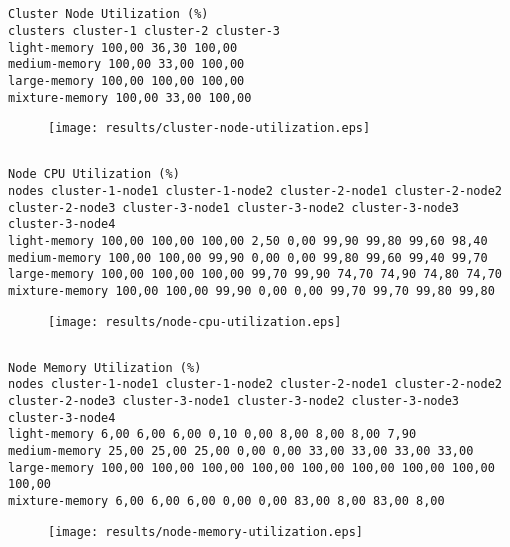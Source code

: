\documentclass{elsart}
\begin{document}
\subsection{}

\begin{lstlisting}[caption={}]
Cluster Node Utilization (%)
clusters cluster-1 cluster-2 cluster-3
light-memory 100,00 36,30 100,00
medium-memory 100,00 33,00 100,00
large-memory 100,00 100,00 100,00
mixture-memory 100,00 33,00 100,00
\end{lstlisting}

\begin{figure}[ht]
\centering
\texttt{[image: results/cluster-node-utilization.eps]}
\caption{}\label{fig:cluster-node-utilization.eps}
\end{figure}

\subsection{}

\begin{lstlisting}[caption={}]
Node CPU Utilization (%)
nodes cluster-1-node1 cluster-1-node2 cluster-2-node1 cluster-2-node2 cluster-2-node3 cluster-3-node1 cluster-3-node2 cluster-3-node3 cluster-3-node4
light-memory 100,00 100,00 100,00 2,50 0,00 99,90 99,80 99,60 98,40
medium-memory 100,00 100,00 99,90 0,00 0,00 99,80 99,60 99,40 99,70
large-memory 100,00 100,00 100,00 99,70 99,90 74,70 74,90 74,80 74,70
mixture-memory 100,00 100,00 99,90 0,00 0,00 99,70 99,70 99,80 99,80
\end{lstlisting}

\begin{figure}[ht]
\centering
\texttt{[image: results/node-cpu-utilization.eps]}
\caption{}\label{fig:node-cpu-utilization.eps}
\end{figure}

\subsection{}

\begin{lstlisting}[caption={}]
Node Memory Utilization (%)
nodes cluster-1-node1 cluster-1-node2 cluster-2-node1 cluster-2-node2 cluster-2-node3 cluster-3-node1 cluster-3-node2 cluster-3-node3 cluster-3-node4
light-memory 6,00 6,00 6,00 0,10 0,00 8,00 8,00 8,00 7,90
medium-memory 25,00 25,00 25,00 0,00 0,00 33,00 33,00 33,00 33,00
large-memory 100,00 100,00 100,00 100,00 100,00 100,00 100,00 100,00 100,00
mixture-memory 6,00 6,00 6,00 0,00 0,00 83,00 8,00 83,00 8,00
\end{lstlisting}

\begin{figure}[ht]
\centering
\texttt{[image: results/node-memory-utilization.eps]}
\caption{}\label{fig:node-memory-utilization.eps}
\end{figure}
\end{document}

